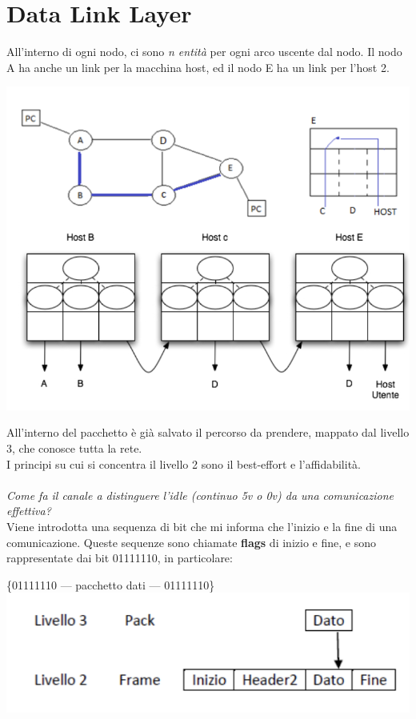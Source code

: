 \documentclass[11pt, oneside]{article}   	%
\begin{document}
\section*{Data Link Layer}
All'interno di ogni nodo, ci sono \emph{n entità} per ogni arco uscente dal nodo. Il nodo A ha anche un link per la macchina host, ed il nodo E ha un link per l'host 2.
\begin{center}
\includegraphics[scale=0.5]{dll}
\end{center}
All'interno del pacchetto è già salvato il percorso da prendere, mappato dal livello 3, che conosce tutta la rete.\\
I principi su cui si concentra il livello 2 sono il best-effort e l'affidabilità. \\\\
\emph{Come fa il canale a distinguere l'idle (continuo 5v o 0v) da una comunicazione effettiva?}\\
Viene introdotta una sequenza di bit che mi informa che l'inizio e la fine di una comunicazione. Queste sequenze sono chiamate \textbf{flags} di inizio e fine, e sono rappresentate dai bit 01111110, in particolare:\begin{center}
\{01111110 --- pacchetto dati --- 01111110\}\\
\includegraphics[scale=0.5]{dll2}
\end{center}
\end{document}
